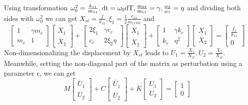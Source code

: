 \documentclass{article}
\begin{document}
%
Using transformation $ \omega_0^2=\frac{k_{11}}{m_{11}},\rm{d} t= \omega_0 \rm{d} T, \frac{m_{22}}{m_{11}}=\gamma ,\frac{\omega_2}{\omega_1}=\eta  $ and dividing both sides with $\omega_0^2$ we can get $X_{st}=\frac{f}{k_{11}},\xi_1=\frac{1}{2}\frac{c_{11}}{m_{11} \omega_0}$ and
\begin{equation}
\begin{bmatrix} 1 & \gamma m_c\\ m_c &1
\end{bmatrix} \begin{bmatrix}
\ddot{X_1}\\ \ddot{X_2}
\end{bmatrix}+\begin{bmatrix} 2 \xi_1 &  \gamma c_c\\ c_c & 2 \xi_2 \eta
\end{bmatrix} \begin{bmatrix} 
\dot{X_1}\\ \dot{X_2}
\end{bmatrix}+\begin{bmatrix} 1 & \gamma k_c\\ k_c & \eta^2
\end{bmatrix} \begin{bmatrix}
X_1\\ X_2
\end{bmatrix}=\begin{bmatrix}
\frac{f_1}{k_{11}}\\0
\end{bmatrix}
\end{equation}
Non-dimensionalizing the displacement by $X_{st}$ leads to $U_1=\frac{X_1}{X_{st}},U_2=\frac{X_2}{X_{st}}$. Meanwhile, setting the non-diagonal part of the matrix as perturbation using a parameter $\epsilon$, we can get
\begin{equation}
M
\begin{bmatrix}
\ddot{U_1}\\\ddot{U_2}
\end{bmatrix}+ C \begin{bmatrix}
\dot{U_1}\\\dot{U_2}
\end{bmatrix}+K\begin{bmatrix}
U_1\\U_2
\end{bmatrix}=\begin{bmatrix}
1 \\0
\end{bmatrix}
\label{eq:coupling pertubed equation}
\end{equation}
\end{document}
